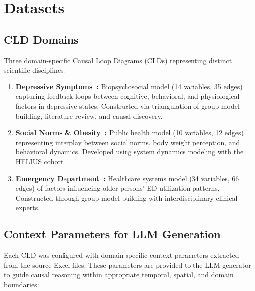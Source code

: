 \section{Datasets}

\subsection{CLD Domains}
Three domain-specific Causal Loop Diagrams (CLDs) representing distinct scientific disciplines:
\begin{enumerate}[noitemsep]
    \item \textbf{Depressive Symptoms~\cite{uleman2024triangulation}:} Biopsychosocial model (14 variables, 35 edges) capturing feedback loops between cognitive, behavioral, and physiological factors in depressive states. Constructed via triangulation of group model building, literature review, and causal discovery.
    \item \textbf{Social Norms \& Obesity~\cite{crielaard2020socialnorms}:} Public health model (10 variables, 12 edges) representing interplay between social norms, body weight perception, and behavioral dynamics. Developed using system dynamics modeling with the HELIUS cohort.
    \item \textbf{Emergency Department~\cite{smeekes2023emergency}:} Healthcare systems model (34 variables, 66 edges) of factors influencing older persons' ED utilization patterns. Constructed through group model building with interdisciplinary clinical experts.
\end{enumerate}

\subsection{Context Parameters for LLM Generation}

Each CLD was configured with domain-specific context parameters extracted from the source Excel files. These parameters are provided to the LLM generator to guide causal reasoning within appropriate temporal, spatial, and domain boundaries:

